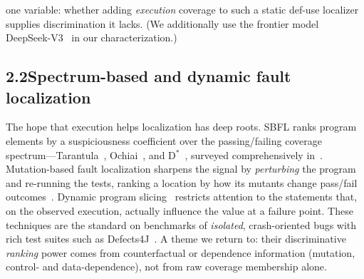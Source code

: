 \documentclass[11pt]{article}
\begin{document}
one variable: whether adding \emph{execution} coverage to such a static def-use localizer supplies discrimination it lacks. (We additionally use the frontier model DeepSeek-V3~\citep{deepseekv3} in our characterization.)

\subsection*{2.2\quad Spectrum-based and dynamic fault localization}
The hope that execution helps localization has deep roots. SBFL ranks program elements by a suspiciousness coefficient over the passing/failing coverage spectrum---Tarantula~\citep{tarantula}, Ochiai~\citep{ochiai}, and D$^\ast$~\citep{dstar}, surveyed comprehensively in~\citep{wong_survey}. Mutation-based fault localization sharpens the signal by \emph{perturbing} the program and re-running the tests, ranking a location by how its mutants change pass/fail outcomes~\citep{muse,metallaxis}. Dynamic program slicing~\citep{korel_laski,agrawal_horgan} restricts attention to the statements that, on the observed execution, actually influence the value at a failure point. These techniques are the standard on benchmarks of \emph{isolated}, crash-oriented bugs with rich test suites such as Defects4J~\citep{defects4j}. A theme we return to: their discriminative \emph{ranking} power comes from counterfactual or dependence information (mutation, control- and data-dependence), not from raw coverage membership alone.
\end{document}
